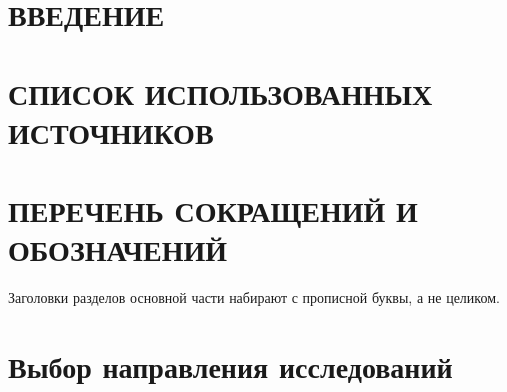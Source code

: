 \section*{ВВЕДЕНИЕ}

\section*{СПИСОК ИСПОЛЬЗОВАННЫХ ИСТОЧНИКОВ}

\section*{ПЕРЕЧЕНЬ СОКРАЩЕНИЙ И ОБОЗНАЧЕНИЙ}

Заголовки разделов основной части набирают с прописной буквы, а не целиком.

\section{Выбор направления исследований}
